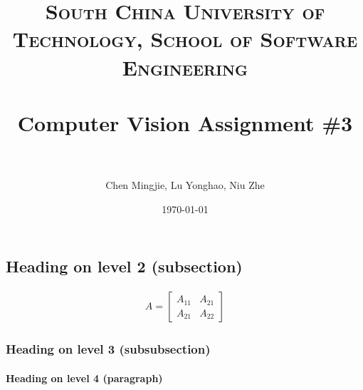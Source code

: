 \documentclass[paper=a4, fontsize=11pt]{scrartcl} %
\title{	
\normalfont \normalsize 
\textsc{South China University of Technology, School of Software Engineering} \\ [25pt] %
\horrule{0.5pt} \\[0.4cm] %
\huge Computer Vision Assignment \#3 \\ %
\horrule{2pt} \\[0.5cm] %
}
\author{Chen Mingjie, Lu Yonghao, Niu Zhe} %
\date{\normalsize\today} %
\numberwithin{equation}{section} %
\numberwithin{figure}{section} %
\numberwithin{table}{section} %
\begin{document}
\maketitle %
















\subsection{Heading on level 2 (subsection)}


\begin{align}
A = 
\begin{bmatrix}
A_{11} & A_{21} \\
A_{21} & A_{22}
\end{bmatrix}
\end{align}



\subsubsection{Heading on level 3 (subsubsection)}


\paragraph{Heading on level 4 (paragraph)}


\end{document}

